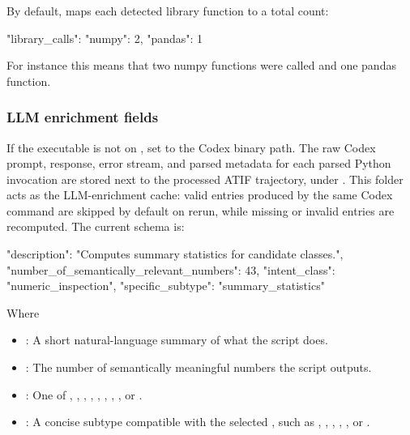 \documentclass[11pt]{article}
\begin{document}
\subsubsection*{}

By default,  maps each detected library function to a total count:

\begin{DocCode}
{
  "library_calls": {
    "numpy": 2,
    "pandas": 1
  }
}
\end{DocCode}
For instance this means that two numpy functions were called and one pandas function.



\subsubsection*{LLM enrichment fields}

If the  executable is not on , set  to the Codex binary path.
The raw Codex prompt, response, error stream, and parsed metadata for each parsed Python invocation are stored next to the processed ATIF trajectory, under .
This folder acts as the LLM-enrichment cache: valid entries produced by the same Codex command are skipped by default on rerun, while missing or invalid entries are recomputed.
The current schema is:
\begin{DocCode}
{
  "description": "Computes summary statistics for candidate classes.",
  "number_of_semantically_relevant_numbers": 43,
  "intent_class": "numeric_inspection",
  "specific_subtype": "summary_statistics"
}
\end{DocCode}
Where
\begin{itemize}
\item {}: A short natural-language summary of what the script does.
\item {}: The number of semantically meaningful numbers the script outputs.
\item {}: One of , , , , , , , , or .
\item {}: A concise subtype compatible with the selected , such as , , , , , or .
\end{itemize}
\end{document}
